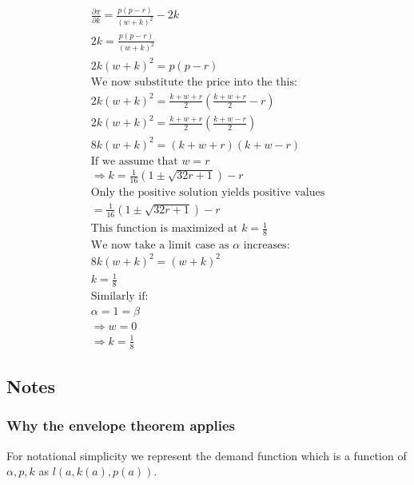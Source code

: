 \documentclass[12pt]{article}
\numberwithin{equation}{section}
\begin{document}
\begin{align*}
\frac{\partial \pi}{\partial k} = \frac{ p(p-r)}{(w
+k)^2} -2k \\
2k= \frac{ p(p-r)}{(w
+k)^2} \\
2k(w+k)^2=p(p-r) \\
\text{We now substitute the price into the this: } \\
2k(w+k)^2=\frac{k+ w+r}{2} \left(\frac{k+ w+r}{2}-r \right) \\
2k(w+k)^2=\frac{k+ w+r}{2} \left(\frac{k+ w-r}{2} \right) \\
8k(w+k)^2= \left( k+ w+r \right) \left(k+ w-r\right) \\
\text{If we assume that $w=r$} \\
\Rightarrow 
k = \frac{1}{16} \left(1\pm \sqrt{32 r+1}\right) - r\\
\text{Only the positive solution yields positive values} \\
= \frac{1}{16} \left(1\pm \sqrt{32 r+1}\right) - r \\
\text{This function is maximized at $k=\frac{1}{8}$} \\
\text{We now take a limit case as $\alpha$ increases:} \\
8k(w+k)^2= \left( w+ k \right)^2 \\
k = \frac{1}{8} \\
\text{Similarly if:} \\
\alpha=1=\beta \\
\Rightarrow w = 0 \\
\Rightarrow k = \frac{1}{8} 
\end{align*}

\subsection{Notes} \label{notes}

\subsubsection{Why the envelope theorem applies} \label{envelopetheorem}


For notational simplicity we represent the demand function which is a function of $\alpha, p, k$ as $l(a, k(a),p(a))$.  
\end{document}

